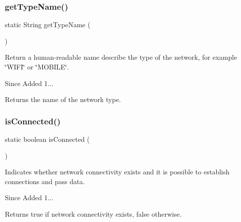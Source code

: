 \subsubsection{\texorpdfstring{get\+Type\+Name()}{getTypeName()}}
{\footnotesize\ttfamily static String get\+Type\+Name (\begin{DoxyParamCaption}{ }\end{DoxyParamCaption})\hspace{0.3cm}{\ttfamily [static]}}



Return a human-\/readable name describe the type of the network, for example \char`\"{}\+W\+I\+F\+I\char`\"{} or \char`\"{}\+M\+O\+B\+I\+L\+E\char`\"{}. 

\begin{DoxySince}{Since}
Added 1... 
\end{DoxySince}
\begin{DoxyReturn}{Returns}
the name of the network type. 
\end{DoxyReturn}
\mbox{\label{classcom_1_1toast_1_1android_1_1gamebase_1_1_gamebase_1_1_network_a794a5c628defa296e0feccd47fcd1113}} 
\subsubsection{\texorpdfstring{is\+Connected()}{isConnected()}}
{\footnotesize\ttfamily static boolean is\+Connected (\begin{DoxyParamCaption}{ }\end{DoxyParamCaption})\hspace{0.3cm}{\ttfamily [static]}}



Indicates whether network connectivity exists and it is possible to establish connections and pass data. 

\begin{DoxySince}{Since}
Added 1... 
\end{DoxySince}
\begin{DoxyReturn}{Returns}
true if network connectivity exists, false otherwise. 
\end{DoxyReturn}
